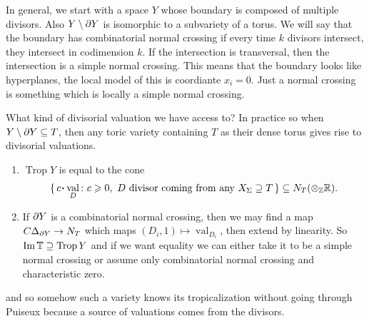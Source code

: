 \documentclass[12pt]{memoir}
\DeclareMathOperator{\val}{val}
\DeclareMathOperator{\Trop}{Trop}
\begin{document}
In general, we start with a space $Y$ whose boundary is composed of multiple divisors. Also $Y\setminus\partial Y$ is isomorphic to a subvariety of a torus. We will say that the boundary has combinatorial normal crossing if every time $k$ divisors intersect, they intersect in codimension $k$. If the intersection is transversal, then the intersection is a simple normal crossing. This means that the boundary looks like hyperplanes, the local model of this is coordiante $x_i=0$. Just a normal crossing is something which is locally a simple normal crossing.\par
What kind of divisorial valuation we have access to? In practice  so when $Y\setminus\partial Y\subseteq T$, then any toric variety containing $T$ as their dense torus gives rise to divisorial valuations.
\begin{enumerate}
    \item $\Trop Y$ is equal to the cone 
    $$\set{c\.\val_D\:\ c\geq 0,\ D\ \text{divisor coming from any }X_\Sg\supseteq T}\subseteq N_T(\ox_\bZ\bR).$$
    \item If $\partial Y$ is a combinatorial normal crossing, then we may find a map $C\Delta_{\partial Y}\to N_T$ which maps $(D_i,1)\mapsto \val_{D_i}$, then extend by linearity. So $\Im\bT\supseteq\Trop Y$ and if we want equality we can either take it to be a simple normal crossing or assume only combinatorial normal crossing and characteristic zero.
\end{enumerate}
and so somehow such a variety knows its tropicalization without going through Puiseux because a source of valuations comes from the divisors. 


\ifx\nextra\undefined
\printindex
\else\fi
\nocite{*}


\end{document}
